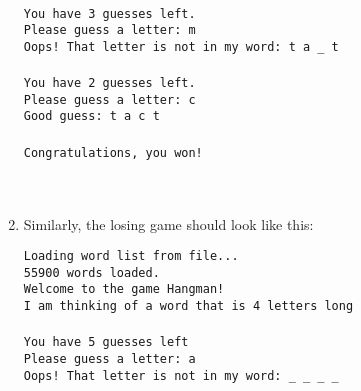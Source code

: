 \documentclass[12pt]{article}
\begin{document}
\begin{enumerate}
\begin{center}
\begin{minipage}{14cm}
			\texttt{\textendash \textendash \textendash \textendash \textendash \textendash \textendash \textendash \textendash \textendash \textendash \textendash \textendash}\\
			\texttt{You have 3 guesses left.\\
			Please guess a letter: m\\
			Oops! That letter is not in my word: t a \_ t}\\
			\texttt{\textendash \textendash \textendash \textendash \textendash \textendash \textendash \textendash \textendash \textendash \textendash \textendash \textendash}\\
			\texttt{You have 2 guesses left.\\
			Please guess a letter: c\\
			Good guess: t a c t }\\
			\texttt{\textendash \textendash \textendash \textendash \textendash \textendash \textendash \textendash \textendash \textendash \textendash \textendash \textendash}\\
			\texttt{Congratulations, you won!}\\	
			\\
			\\
		\end{minipage}
	\end{center}
	\item Similarly, the losing game should look like this:\\
	\begin{center}
		\begin{minipage}{14cm}
			\texttt{Loading word list from file...\\
				55900 words loaded.\\
				Welcome to the game Hangman!\\
				I am thinking of a word that is 4 letters long\\
				\textendash \textendash \textendash \textendash \textendash \textendash \textendash \textendash \textendash \textendash \textendash \textendash \textendash \\
				}
				\texttt{You have 5 guesses left \\
				Please guess a letter: a \\
				Oops! That letter is not in my word: \_ \_ \_ \_ \\
				\textendash \textendash \textendash \textendash \textendash \textendash \textendash \textendash \textendash \textendash \textendash \textendash \textendash \\	
}
\end{minipage}
\end{center}
\end{enumerate}
\end{document}
